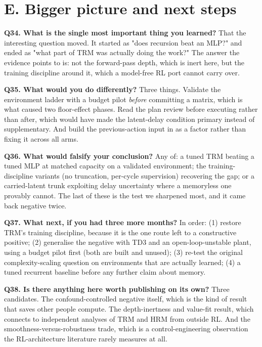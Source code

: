 \documentclass[11pt]{article}
\begin{document}
\section*{E. Bigger picture and next steps}



\textbf{Q34. What is the single most important thing you learned?} That the interesting question moved. It started as "does recursion beat an MLP?" and ended as "what part of TRM was actually doing the work?" The answer the evidence points to is: not the forward-pass depth, which is inert here, but the training discipline around it, which a model-free RL port cannot carry over.



\textbf{Q35. What would you do differently?} Three things. Validate the environment ladder with a budget pilot \emph{before} committing a matrix, which is what caused two floor-effect phases. Read the plan review before executing rather than after, which would have made the latent-delay condition primary instead of supplementary. And build the previous-action input in as a factor rather than fixing it across all arms.



\textbf{Q36. What would falsify your conclusion?} Any of: a tuned TRM beating a tuned MLP at matched capacity on a validated environment; the training-discipline variants (no truncation, per-cycle supervision) recovering the gap; or a carried-latent trunk exploiting delay uncertainty where a memoryless one provably cannot. The last of these is the test we sharpened most, and it came back negative twice.



\textbf{Q37. What next, if you had three more months?} In order: (1) restore TRM's training discipline, because it is the one route left to a constructive positive; (2) generalise the negative with TD3 and an open-loop-unstable plant, using a budget pilot first (both are built and unused); (3) re-test the original complexity-scaling question on environments that are actually learned; (4) a tuned recurrent baseline before any further claim about memory.



\textbf{Q38. Is there anything here worth publishing on its own?} Three candidates. The confound-controlled negative itself, which is the kind of result that saves other people compute. The depth-inertness and value-fit result, which connects to independent analyses of TRM and HRM from outside RL. And the smoothness-versus-robustness trade, which is a control-engineering observation the RL-architecture literature rarely measures at all.
\end{document}
